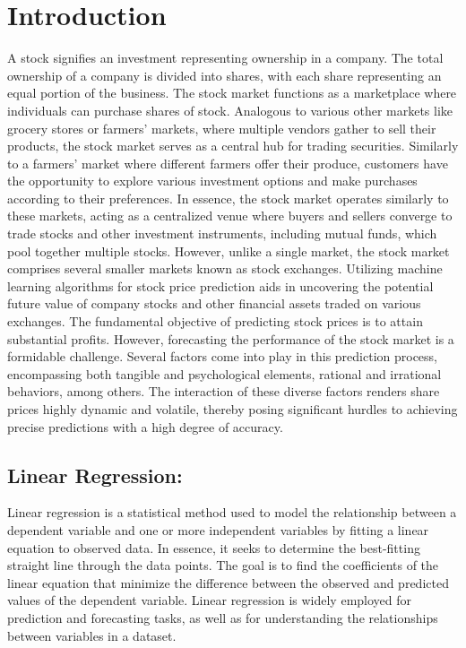 \documentclass[conference,onecolumn,11pt]{IEEEtran}
\begin{document}
\section{Introduction}
A stock signifies an investment representing ownership in a company. The total ownership of a company is divided into shares, with each share representing an equal portion of the business. The stock market functions as a marketplace where individuals can purchase shares of stock. Analogous to various other markets like grocery stores or farmers’ markets, where multiple vendors gather to sell their products, the stock market serves as a central hub for trading securities. Similarly to a farmers’ market where different farmers offer their produce, customers have the opportunity to explore various investment options and make purchases according to their preferences. In essence, the stock market operates similarly to these markets, acting as a centralized venue where buyers and sellers converge to trade stocks and other investment instruments, including mutual funds, which pool together multiple stocks. However, unlike a single market, the stock market comprises several smaller markets known as stock exchanges.
Utilizing machine learning algorithms for stock price prediction aids in uncovering the potential future value of company stocks and other financial assets traded on various exchanges. The fundamental objective of predicting stock prices is to attain substantial profits. However, forecasting the performance of the stock market is a formidable challenge. Several factors come into play in this prediction process, encompassing both tangible and psychological elements, rational and irrational behaviors, among others.
The interaction of these diverse factors renders share prices highly dynamic and volatile, thereby posing significant hurdles to achieving precise predictions with a high degree of accuracy.


\subsection*{Linear Regression:}

Linear regression is a statistical method used to model the relationship between a dependent variable and one or more independent variables by fitting a linear equation to observed data. In essence, it seeks to determine the best-fitting straight line through the data points. The goal is to find the coefficients of the linear equation that minimize the difference between the observed and predicted values of the dependent variable. Linear regression is widely employed for prediction and forecasting tasks, as well as for understanding the relationships between variables in a dataset.
\end{document}
